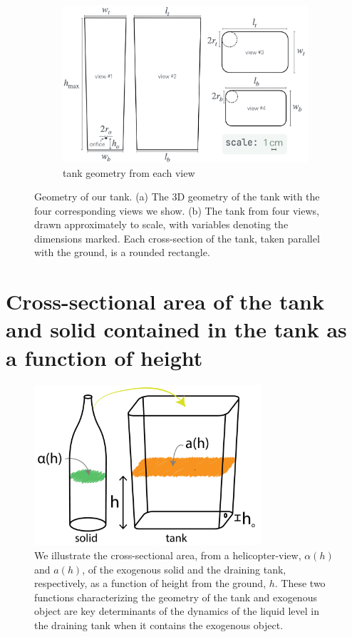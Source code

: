 \documentclass[a4paper,fleqn]{cas-sc}
\begin{document}
\begin{figure}[h!]
	\begin{subfigure}[b]{0.8\textwidth}
		\includegraphics[width=\textwidth]{../drawings_and_photos/tank_geometry.png} \caption{tank geometry from each view}
	\end{subfigure}
	\caption{Geometry of our tank. 
	(a) The 3D geometry of the tank with the four corresponding views we show. (b) The tank from four views, drawn approximately to scale, with variables denoting the dimensions marked. Each cross-section of the tank, taken parallel with the ground, is a rounded rectangle.
	}
\end{figure}

\clearpage

\section{Cross-sectional area of the tank and solid contained in the tank as a function of height}

\begin{figure}[h!]
	\centering
	\includegraphics[width=0.75\textwidth]{../drawings_and_photos/a_of_h.pdf} 
	\caption{We illustrate the cross-sectional area, from a helicopter-view, $\alpha(h)$ and $a(h)$, of the exogenous solid and the draining tank, respectively, as a function of height from the ground, $h$. These two functions characterizing the geometry of the tank and exogenous object are key determinants of the dynamics of the liquid level in the draining tank when it contains the exogenous object.}
\end{figure}
\end{document}
